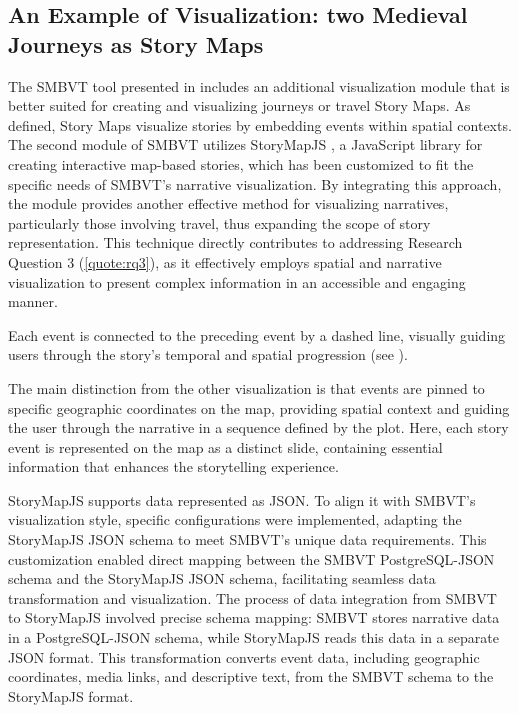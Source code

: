 \subsection{An Example of Visualization: two Medieval Journeys as Story Maps}\label{VII-subsec:imago-visualization}

The SMBVT tool presented in  includes an additional visualization module that is better suited for creating and visualizing journeys or travel Story Maps. As defined, Story Maps visualize stories by embedding events within spatial contexts. The second module of SMBVT utilizes StoryMapJS \cite{knightlabStoryMapJS}, a JavaScript library for creating interactive map-based stories, which has been customized to fit the specific needs of SMBVT’s narrative visualization. By integrating this approach, the module provides another effective method for visualizing narratives, particularly those involving travel, thus expanding the scope of story representation. This technique directly contributes to addressing Research Question 3 (\ref{quote:rq3}), as it effectively employs spatial and narrative visualization to present complex information in an accessible and engaging manner.

Each event is connected to the preceding event by a dashed line, visually guiding users through the story’s temporal and spatial progression (see ).

The main distinction from the other visualization is that events are pinned to specific geographic coordinates on the map, providing spatial context and guiding the user through the narrative in a sequence defined by the plot. Here, each story event is represented on the map as a distinct slide, containing essential information that enhances the storytelling experience.

StoryMapJS supports data represented as JSON. To align it with SMBVT’s visualization style, specific configurations were implemented, adapting the StoryMapJS JSON schema to meet SMBVT’s unique data requirements. This customization enabled direct mapping between the SMBVT PostgreSQL-JSON schema and the StoryMapJS JSON schema, facilitating seamless data transformation and visualization. The process of data integration from SMBVT to StoryMapJS involved precise schema mapping: SMBVT stores narrative data in a PostgreSQL-JSON schema, while StoryMapJS reads this data in a separate JSON format. This transformation converts event data, including geographic coordinates, media links, and descriptive text, from the SMBVT schema to the StoryMapJS format.

